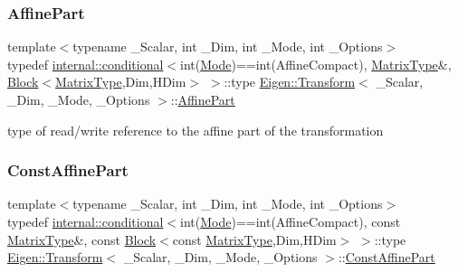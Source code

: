 \subsubsection{\texorpdfstring{AffinePart}{AffinePart}}
{\footnotesize\ttfamily template$<$typename \+\_\+\+Scalar, int \+\_\+\+Dim, int \+\_\+\+Mode, int \+\_\+\+Options$>$ \\
typedef \mbox{\hyperlink{struct_eigen_1_1internal_1_1conditional}{internal\+::conditional}}$<$int(\mbox{\hyperlink{struct_mode}{Mode}})==int(Affine\+Compact), \mbox{\hyperlink{class_eigen_1_1_transform_a30f72ba46abc2bb3c7fa919c1078fc9c}{Matrix\+Type}}\&, \mbox{\hyperlink{class_eigen_1_1_block}{Block}}$<$\mbox{\hyperlink{class_eigen_1_1_transform_a30f72ba46abc2bb3c7fa919c1078fc9c}{Matrix\+Type}},Dim,H\+Dim$>$ $>$\+::type \mbox{\hyperlink{class_eigen_1_1_transform}{Eigen\+::\+Transform}}$<$ \+\_\+\+Scalar, \+\_\+\+Dim, \+\_\+\+Mode, \+\_\+\+Options $>$\+::\mbox{\hyperlink{class_eigen_1_1_transform_a8319bad977b0dabf2dfaf2e2dc30f13e}{Affine\+Part}}}

type of read/write reference to the affine part of the transformation \mbox{\label{class_eigen_1_1_transform_adfa0bf2d9504548cdc9b9051b2fa9673}} 
\subsubsection{\texorpdfstring{ConstAffinePart}{ConstAffinePart}}
{\footnotesize\ttfamily template$<$typename \+\_\+\+Scalar, int \+\_\+\+Dim, int \+\_\+\+Mode, int \+\_\+\+Options$>$ \\
typedef \mbox{\hyperlink{struct_eigen_1_1internal_1_1conditional}{internal\+::conditional}}$<$int(\mbox{\hyperlink{struct_mode}{Mode}})==int(Affine\+Compact), const \mbox{\hyperlink{class_eigen_1_1_transform_a30f72ba46abc2bb3c7fa919c1078fc9c}{Matrix\+Type}}\&, const \mbox{\hyperlink{class_eigen_1_1_block}{Block}}$<$const \mbox{\hyperlink{class_eigen_1_1_transform_a30f72ba46abc2bb3c7fa919c1078fc9c}{Matrix\+Type}},Dim,H\+Dim$>$ $>$\+::type \mbox{\hyperlink{class_eigen_1_1_transform}{Eigen\+::\+Transform}}$<$ \+\_\+\+Scalar, \+\_\+\+Dim, \+\_\+\+Mode, \+\_\+\+Options $>$\+::\mbox{\hyperlink{class_eigen_1_1_transform_adfa0bf2d9504548cdc9b9051b2fa9673}{Const\+Affine\+Part}}}

